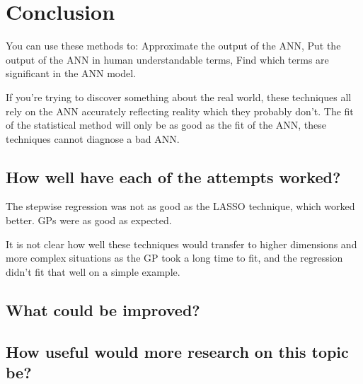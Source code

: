 
\chapter{Conclusion}

You can use these methods to:
Approximate the output of the \acl{ANN},
Put the output of the \acl{ANN} in human understandable terms,
Find which terms are significant in the \acl{ANN} model.

If you're trying to discover something about the real world, these techniques all rely on the \acl{ANN} accurately reflecting reality which they probably don't.
The fit of the statistical method will only be as good as the fit of the ANN, these techniques cannot diagnose a bad \acl{ANN}.


\section{How well have each of the attempts worked?}

The stepwise regression was not as good as the \ac{LASSO} technique, which worked better.
\acp{GP} were as good as expected.

It is not clear how well these techniques would transfer to higher dimensions and more complex situations as the \ac{GP} took a long time to fit, and the regression didn't fit that well on a simple example.

\section{What could be improved?}

\section{How useful would more research on this topic be?}

